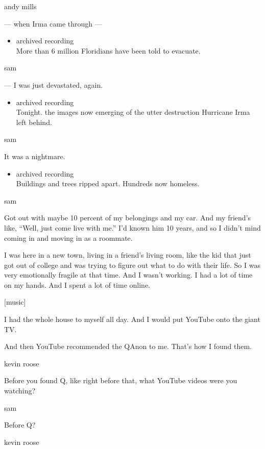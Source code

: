 andy mills

--- when Irma came through ---

\begin{itemize}
\tightlist
\item
  archived recording\\
  More than 6 million Floridians have been told to evacuate.
\end{itemize}

sam

--- I was just devastated, again.

\begin{itemize}
\tightlist
\item
  archived recording\\
  Tonight. the images now emerging of the utter destruction Hurricane
  Irma left behind.
\end{itemize}

sam

It was a nightmare.

\begin{itemize}
\tightlist
\item
  archived recording\\
  Buildings and trees ripped apart. Hundreds now homeless.
\end{itemize}

sam

Got out with maybe 10 percent of my belongings and my car. And my
friend's like, ``Well, just come live with me.'' I'd known him 10 years,
and so I didn't mind coming in and moving in as a roommate.

I was here in a new town, living in a friend's living room, like the kid
that just got out of college and was trying to figure out what to do
with their life. So I was very emotionally fragile at that time. And I
wasn't working. I had a lot of time on my hands. And I spent a lot of
time online.

{[}music{]}

I had the whole house to myself all day. And I would put YouTube onto
the giant TV.

And then YouTube recommended the QAnon to me. That's how I found them.

kevin roose

Before you found Q, like right before that, what YouTube videos were you
watching?

sam

Before Q?

kevin roose

